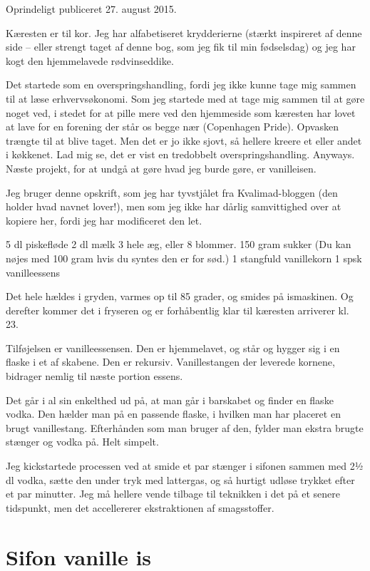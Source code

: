\documentclass[
]{book}
\begin{document}
Oprindeligt publiceret 27. august 2015.

Kæresten er til kor. Jeg har alfabetiseret krydderierne (stærkt inspireret af denne side -- eller strengt taget af denne bog, som jeg fik til min fødselsdag) og jeg har kogt den hjemmelavede rødvinseddike.

Det startede som en overspringshandling, fordi jeg ikke kunne tage mig sammen til at læse erhvervsøkonomi. Som jeg startede med at tage mig sammen til at gøre noget ved, i stedet for at pille mere ved den hjemmeside som kæresten har lovet at lave for en forening der står os begge nær (Copenhagen Pride). Opvasken trængte til at blive taget. Men det er jo ikke sjovt, så hellere kreere et eller andet i køkkenet. Lad mig se, det er vist en tredobbelt overspringshandling. Anyways. Næste projekt, for at undgå at gøre hvad jeg burde gøre, er vanilleisen.~

Jeg bruger denne opskrift, som jeg har tyvstjålet fra Kvalimad-bloggen (den holder hvad navnet lover!), men som jeg ikke har dårlig samvittighed over at kopiere her, fordi jeg har modificeret den let.

5 dl piskefløde
2 dl mælk
3 hele æg, eller 8 blommer.
150 gram sukker (Du kan nøjes med 100 gram hvis du syntes den er for sød.)
1 stangfuld vanillekorn
1 spsk vanilleessens

Det hele hældes i gryden, varmes op til 85 grader, og smides på ismaskinen. Og derefter kommer det i fryseren og er forhåbentlig klar til kæresten arriverer kl. 23.~

Tilføjelsen er vanilleessensen. Den er hjemmelavet, og står og hygger sig i en flaske i et af skabene. Den er rekursiv. Vanillestangen der leverede kornene, bidrager nemlig til næste portion essens.

Det går i al sin enkelthed ud på, at man går i barskabet og finder en flaske vodka. Den hælder man på en passende flaske, i hvilken man har placeret en brugt vanillestang. Efterhånden som man bruger af den, fylder man ekstra brugte stænger og vodka på. Helt simpelt.

Jeg kickstartede processen ved at smide et par stænger i sifonen sammen med 2½ dl vodka, sætte den under tryk med lattergas, og så hurtigt udløse trykket efter et par minutter. Jeg må hellere vende tilbage til teknikken i det på et senere tidspunkt, men det accellererer ekstraktionen af smagsstoffer.

\section{Sifon vanille is}\label{sifon-vanille-is}
\end{document}
